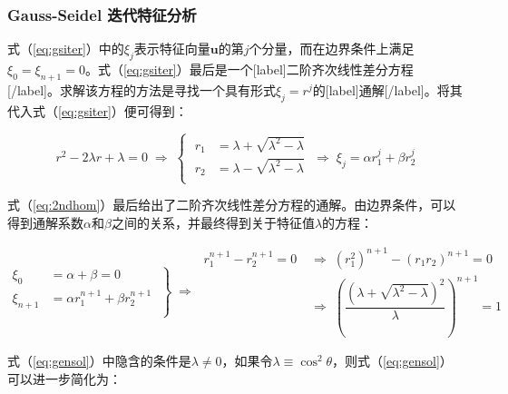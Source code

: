\documentclass[12pt, UTF8, nofonts]{ctexart}
\begin{document}


\subsubsection*{Gauss-Seidel 迭代特征分析}

式（\ref{eq:gsiter}）中的$\xi_j$表示特征向量$\boldsymbol{u}$的第$j$个分量，而在边界条件上满足$\xi_0=\xi_{n+1}=0$。式（\ref{eq:gsiter}）最后是一个[label]二阶齐次线性差分方程[/label]。求解该方程的方法是寻找一个具有形式$\xi_j=r^j$的[label]通解[/label]。将其代入式（\ref{eq:gsiter}）便可得到：

\begin{equation}
  \label{eq:2ndhom}
  r^2 - 2\lambda r + \lambda = 0 \;\Rightarrow\;
  \left\{ \; \begin{aligned}
    r_1 &= \lambda + \sqrt{\lambda^2-\lambda} \\
    r_2 &= \lambda - \sqrt{\lambda^2-\lambda} \\
  \end{aligned} \right. \;\Rightarrow\;
  \xi_j = \alpha r_1^j + \beta r_2^j
\end{equation}

式（\ref{eq:2ndhom}）最后给出了二阶齐次线性差分方程的通解。由边界条件，可以得到通解系数$\alpha$和$\beta$之间的关系，并最终得到关于特征值$\lambda$的方程：

\begin{equation}
  \label{eq:gensol}
  \left.\begin{aligned}
    \xi_0 &= \alpha + \beta = 0 \\
    \xi_{n+1} &= \alpha r_1^{n+1} + \beta r_2^{n+1} \\
  \end{aligned} \;\right\} \;\Rightarrow\;
  \begin{aligned}
    r_1^{n+1} - r_2^{n+1} = 0 &\;\Rightarrow\; (r_1^2)^{n+1} - (r_1r_2)^{n+1} = 0 \\
    &\;\Rightarrow\; \left(\dfrac{\left(\lambda + \sqrt{\lambda^2-\lambda} \right)^2}{\lambda}\right)^{n+1} = 1
  \end{aligned}
\end{equation}

式（\ref{eq:gensol}）中隐含的条件是$\lambda\neq0$，如果令$\lambda\equiv\cos^2\theta$，则式（\ref{eq:gensol}）可以进一步简化为：
\end{document}
